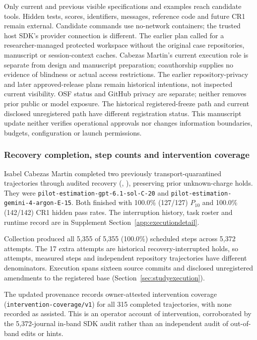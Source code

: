 Only current and previous visible specifications and examples reach
candidate tools. Hidden tests, scores, identifiers, messages, reference
code and future CR1 remain external. Candidate commands use no-network
containers; the trusted host SDK's provider connection is different.
The earlier plan called for a researcher-managed protected workspace
without the original case repositories, manuscript or session-context
caches. Cabezas Martin's current execution role is separate from design
and manuscript preparation; coauthorship supplies no evidence of blindness
or actual access restrictions.
The earlier repository-privacy and later approved-release plans remain
historical intentions, not inspected current visibility.
OSF status and GitHub privacy are separate; neither removes prior public
or model exposure. The historical registered-freeze path and current
disclosed unregistered path have different registration status.
This manuscript update neither verifies operational approvals nor changes
information boundaries, budgets, configuration or launch permissions.

\subsubsection{Recovery completion, step counts and intervention coverage}

Isabel Cabezas Martin completed two previously transport-quarantined
trajectories through audited recovery (, ),
preserving prior unknown-charge holds. They were
{\def\UrlBreaks{\do\-}\def\UrlBigBreaks{}\nolinkurl{pilot-estimation-gpt-6.1-sol-C-20}} and
{\def\UrlBreaks{\do\-}\def\UrlBigBreaks{}\nolinkurl{pilot-estimation-gemini-4-argon-E-15}}. Both finished with 100.0\%
(127/127) $P_{10}$ and 100.0\% (142/142) CR1 hidden pass rates.
The interruption history, task roster and runtime record are in Supplement
Section~\ref{app:executiondetail}.

Collection produced all 5,355 of 5,355 (100.0\%) scheduled steps across
5,372 attempts. The 17 extra attempts are historical recovery-interrupted
holds, so attempts, measured steps and independent repository trajectories
have different denominators. Execution spans sixteen source commits and
disclosed unregistered amendments to the registered base
(Section~\ref{sec:studyexecution}).

The updated provenance records owner-attested intervention coverage
(\nolinkurl{intervention-coverage/v1}) for all 315 completed trajectories,
with none recorded as assisted. This is an operator account of intervention,
corroborated by the 5,372-journal in-band SDK audit rather than an
independent audit of out-of-band edits or hints.

